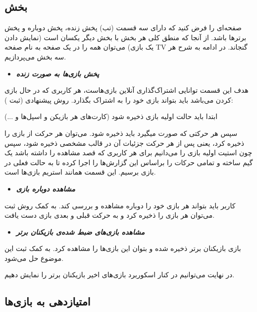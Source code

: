\documentclass[]{article}
\begin{document}
\subsection*{{\titr بخش }}

صفحه‌ای را فرض کنید که دارای سه قسمت (تب) پخش زنده، پخش دوباره و پخش‌ برتر‌ها باشد.
از آنجا که منطق کلی هر بخش با بخش دیگر یکسان است (نمایش دادن یک بازی) می‌توان همه را در یک صفحه به نام صفحه TV گنجاند. در ادامه به شرح هر سه بخش می‌پردازیم.

\begin{itemize}
	\item \textbf{\emph{پخش بازی‌ها به صورت زنده}}
\end{itemize}
هدف این قسمت توانایی اشتراک‌گذاری آنلاین بازی‌هاست، هر کاربری که در حال بازی کردن می‌باشد باید بتواند بازی خود را به اشتراک بگذارد.
روش‌ پیشنهادی (ثبت ):

ابتدا باید حالت اولیه بازی ذخیره شود (کارت‌های هر بازیکن و اسپل‌ها و ...)

سپس هر حرکتی که صورت میگیرد باید ذخیره شود. می‌توان هر حرکت از بازی را ذخیره کرد، یعنی پس از هر حرکت جزئیات آن در قالب مشخصی ذخیره شود، سپس چون استیت اولیه بازی را می‌دانیم برای هر کاربری که قصد مشاهده را داشته باشد یک گیم ساخته و تمامی حرکات را براساس این گزارش‌ها را اجرا کرده تا به حالت فعلی در بازی برسیم.
این قسمت همانند استریم بازی‌ها است.

\begin{itemize}
	\item \textbf{\emph{مشاهده دوباره بازی}}
\end{itemize}
کاربر باید بتواند هر بازی خود را دوباره مشاهده و بررسی کند. 
به کمک روش ثبت  می‌توان هر بازی را ذخیره کرد و به حرکت قبلی و بعدی بازی دست یافت.


\begin{itemize}
	\item \textbf{\emph{مشاهده بازی‌های ضبط شده‌ی بازیکنان برتر}}
\end{itemize}
بازی بازیکنان برتر ذخیره شده و بتوان این بازی‌ها را مشاهده کرد.
به کمک ثبت  این موضوع حل می‌شود.

در نهایت می‌توانیم در کنار اسکوربرد بازی‌های اخیر بازیکنان برتر را نمایش دهیم.

\subsection*{{\titr امتیازدهی به بازی‌ها}}
\end{document}
